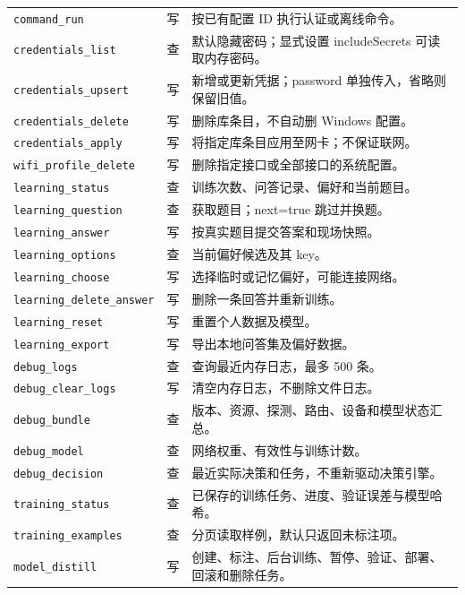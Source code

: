 \documentclass[UTF8,fontset=fandol,11pt,a4paper]{ctexart}
\newcommand{\tool}[1]{\nolinkurl{#1}}
\begin{document}
\begin{longtable}{@{}p{48mm}p{9mm}p{96mm}@{}}
\tool{command_run} & 写 & 按已有配置 ID 执行认证或离线命令。\\
\tool{credentials_list} & 查 & 默认隐藏密码；显式设置 includeSecrets 可读取内存密码。\\
\tool{credentials_upsert} & 写 & 新增或更新凭据；password 单独传入，省略则保留旧值。\\
\tool{credentials_delete} & 写 & 删除库条目，不自动删 Windows 配置。\\
\tool{credentials_apply} & 写 & 将指定库条目应用至网卡；不保证联网。\\
\tool{wifi_profile_delete} & 写 & 删除指定接口或全部接口的系统配置。\\
\tool{learning_status} & 查 & 训练次数、问答记录、偏好和当前题目。\\
\tool{learning_question} & 查 & 获取题目；next=true 跳过并换题。\\
\tool{learning_answer} & 写 & 按真实题目提交答案和现场快照。\\
\tool{learning_options} & 查 & 当前偏好候选及其 key。\\
\tool{learning_choose} & 写 & 选择临时或记忆偏好，可能连接网络。\\
\tool{learning_delete_answer} & 写 & 删除一条回答并重新训练。\\
\tool{learning_reset} & 写 & 重置个人数据及模型。\\
\tool{learning_export} & 写 & 导出本地问答集及偏好数据。\\
\tool{debug_logs} & 查 & 查询最近内存日志，最多 500 条。\\
\tool{debug_clear_logs} & 写 & 清空内存日志，不删除文件日志。\\
\tool{debug_bundle} & 查 & 版本、资源、探测、路由、设备和模型状态汇总。\\
\tool{debug_model} & 查 & 网络权重、有效性与训练计数。\\
\tool{debug_decision} & 查 & 最近实际决策和任务，不重新驱动决策引擎。\\
\tool{training_status} & 查 & 已保存的训练任务、进度、验证误差与模型哈希。\\
\tool{training_examples} & 查 & 分页读取样例，默认只返回未标注项。\\
\tool{model_distill} & 写 & 创建、标注、后台训练、暂停、验证、部署、回滚和删除任务。\\
\bottomrule
\end{longtable}\endgroup
\end{document}
